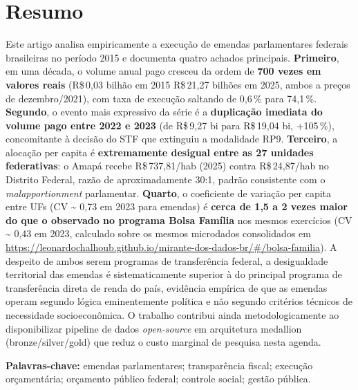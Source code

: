\documentclass[12pt,a4paper,oneside]{article}
\newcommand{\rs}{R\$\,}
\begin{document}
\section*{Resumo}
\begin{singlespace}\small\noindent
Este artigo analisa empiricamente a execução de emendas parlamentares
federais brasileiras no período 2015 e documenta quatro
achados principais. \textbf{Primeiro}, em uma década, o volume anual
pago cresceu da ordem de \textbf{700 vezes em valores reais}
(\rs 0{,}03 bilhão em 2015 \textrightarrow{} \rs 21{,}27 bilhões em 2025,
ambos a preços de dezembro/2021), com taxa de execução saltando de
0{,}6\,\% para 74{,}1\,\%. \textbf{Segundo}, o evento mais expressivo
da série é a \textbf{duplicação imediata do volume pago entre 2022 e
2023} (de \rs 9{,}27 bi para \rs 19{,}04 bi, +105\,\%), concomitante
à decisão do STF que extinguiu a modalidade RP9. \textbf{Terceiro}, a
alocação per capita é \textbf{extremamente desigual entre as 27
unidades federativas}: o Amapá recebe \rs 737{,}81/hab (2025) contra
\rs 24{,}87/hab no Distrito Federal, razão de aproximadamente 30:1,
padrão consistente com o \textit{malapportionment} parlamentar.
\textbf{Quarto}, o coeficiente de variação per capita entre UFs (CV
\textasciitilde{} 0{,}73 em 2023 para emendas) é \textbf{cerca de
1{,}5 a 2 vezes maior do que o observado no programa Bolsa Família}
nos mesmos exercícios (CV \textasciitilde{} 0{,}43 em 2023, calculado
sobre os mesmos microdados consolidados em
\url{https://leonardochalhoub.github.io/mirante-dos-dados-br/\#/bolsa-familia}).
A despeito de ambos serem programas de transferência federal, a
desigualdade territorial das emendas é sistematicamente superior à do
principal programa de transferência direta de renda do país,
evidência empírica de que as emendas operam segundo lógica
eminentemente política e não segundo critérios técnicos de
necessidade socioeconômica. O trabalho contribui ainda
metodologicamente ao disponibilizar pipeline de dados
\textit{open-source} em arquitetura medallion (bronze/silver/gold)
que reduz o custo marginal de pesquisa nesta agenda.

\vspace{0.4cm}\noindent\textbf{Palavras-chave:}
emendas parlamentares; transparência fiscal; execução orçamentária;
orçamento público federal; controle social; gestão pública.
\end{singlespace}

\end{document}
